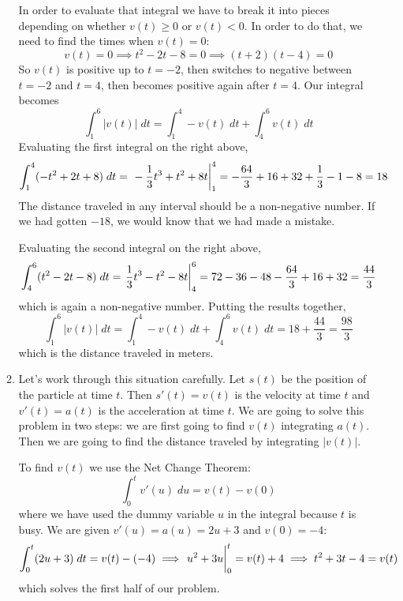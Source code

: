 \documentclass{article}
\begin{document}
\begin{enumerate}
\begin{enumerate}
    In order to evaluate that integral we have to break it into pieces
    depending on whether $v(t)\ge 0$ or $v(t)<0$.  In order to do that,
    we need to find the times when $v(t)=0$:
    \begin{equation*}
      v(t)=0 \implies t^2 - 2t - 8 = 0 \implies (t+2)(t-4) = 0
    \end{equation*}
    So $v(t)$ is positive up to $t=-2$, then switches to negative
    between $t=-2$ and $t=4$, then becomes positive again after $t=4$.
    Our integral becomes
    \begin{equation*}
      \int_1^6 |v(t)| \; dt = \int_1^4 -v(t) \; dt + \int_4^6 v(t) \; dt
    \end{equation*}
    Evaluating the first integral on the right above,
    \begin{equation*}
      \int_1^4 (-t^2 + 2t +8) \; dt
      = \left. \vphantom{\int} -\frac{1}{3} t^3 + t^2 + 8t \right|_1^4
      = -\frac{64}{3} + 16 + 32 + \frac{1}{3} - 1 - 8
      = 18
    \end{equation*}
    The distance traveled in any interval should be a non-negative
    number.  If we had gotten $-18$, we would know that we had made a
    mistake.
    
    Evaluating the second integral on the right above,
    \begin{equation*}
      \int_4^6 (t^2 - 2t - 8) \; dt
      = \left. \vphantom{\int} \frac{1}{3} t^3 - t^2 - 8t \right|_4^6
      = 72 - 36 - 48 - \frac{64}{3} + 16 + 32 = \frac{44}{3}
    \end{equation*}
    which is again a non-negative number.  Putting the results together,
    \begin{equation*}
      \int_1^6 |v(t)| \; dt = \int_1^4 -v(t) \; dt + \int_4^6 v(t) \; dt
      = 18 + \frac{44}{3} = \frac{98}{3}
    \end{equation*}
    which is the distance traveled in meters.
  \item Let's work through this situation carefully.  Let $s(t)$ be
    the position of the particle at time $t$.  Then $s'(t)=v(t)$ is
    the velocity at time $t$ and $v'(t)= a(t)$ is the acceleration at
    time $t$.  We are going to solve this problem in two steps: we are
    first going to find $v(t)$ integrating $a(t)$.  Then we
    are going to find the distance traveled by integrating $|v(t)|$.

    To find $v(t)$ we use the Net Change Theorem:
    \begin{equation*}
      \int_0^t v'(u) \; du = v(t)-v(0)
    \end{equation*}
    where we have used the dummy variable $u$ in the integral because
    $t$ is busy.  We are given $v'(u)=a(u)=2u+3$ and $v(0)=-4$:
    \begin{equation*}
      \int_0^t (2u+3) \; dt = v(t)-(-4)
      \implies
      \left. \vphantom{\int} u^2 + 3u \right|_0^t = v(t)+4
      \implies
      t^2 + 3t - 4 = v(t)
    \end{equation*}
    which solves the first half of our problem.


\end{enumerate}
\end{enumerate}
\end{document}
